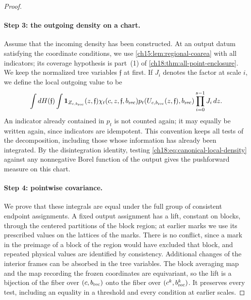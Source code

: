 \begin{proof}
\paragraph{Step 3: the outgoing density on a chart.}
Assume that the incoming density has been constructed. At an output datum satisfying the coordinate conditions, we use \cref{ch15:lem:regional-coarea} with all indicators; its coverage hypothesis is part~(1) of \cref{ch18:thm:all-point-enclosure}. We keep the normalized tree variables $\mathfrak f$ at first. If $J_i$ denotes the factor at scale $i$, we define the local outgoing value to be
\begin{equation}\label{ch18:eq:canonical-local-density}
 \int dH(\mathfrak f)\int
  \mathbf 1_{Z_{c,b_{\mathrm{rec}}}}(z,\mathfrak f)
  \chi_t(c,z,\mathfrak f,b_{\mathrm{rec}})
  p_t(U_{c,b_{\mathrm{rec}}}(z,\mathfrak f),b_{\mathrm{rec}})
                 \prod_{i=0}^{s-1}J_i\,dz.
\end{equation}
An indicator already contained in $p_t$ is not counted again; it may equally be written again, since indicators are idempotent. This convention keeps all tests of the decomposition, including those whose information has already been integrated. By the disintegration identity, testing \eqref{ch18:eq:canonical-local-density} against any nonnegative Borel function of the output gives the pushforward measure on this chart.

\paragraph{Step 4: pointwise covariance.}
We prove that these integrals are equal under the full group of consistent endpoint assignments. A fixed output assignment has a lift, constant on blocks, through the centered partitions of the block region; at earlier marks we use its prescribed values on the lattices of the marks. There is no conflict, since a mark in the preimage of a block of the region would have excluded that block, and repeated physical values are identified by consistency. Additional changes of the interior frames can be absorbed in the tree variables. The block averaging map and the map recording the frozen coordinates are equivariant, so the lift is a bijection of the fiber over $(c,b_{\mathrm{rec}})$ onto the fiber over $(c^k,b_{\mathrm{rec}}^k)$. It preserves every test, including an equality in a threshold and every condition at earlier scales.


\end{proof}

